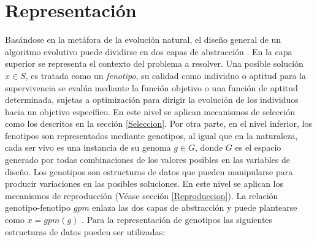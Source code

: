\section{Representación}
Basándose en la metáfora de la evolución natural, el diseño general de un algoritmo evolutivo puede dividirse en dos capas de abstracción \cite{eiben2015evolutionary}. En la capa superior se representa el contexto del problema a resolver. Una posible solución $x \in S$, es tratada como un \textit{fenotipo}, su calidad como individuo o aptitud para la supervivencia se evalúa mediante la función objetivo o una función de aptitud determinada, sujetas a optimización para dirigir la evolución de los individuos hacia un objetivo específico. En este nivel se aplican mecanismos de selección como los descritos en la sección \ref{Seleccion}. Por otra parte, en el nivel inferior, los fenotipos son representados mediante genotipos, al igual que en la naturaleza, cada ser vivo es una instancia de su genoma $g \in G $, donde $G$ es el espacio generado por todas combinaciones de los valores posibles en las variables de diseño. Los genotipos son estructuras de datos que pueden manipularse para producir variaciones en las posibles soluciones. En este nivel se aplican los mecanismos de reproducción (Véase sección \ref{Reproduccion}). La relación genotipo-fenotipo $gpm$ enlaza  las dos capas de abstracción y puede plantearse como $x = gpm (g)$ \cite{weise2009global}. Para la representación de genotipos las siguientes estructuras de datos pueden ser utilizadas:
